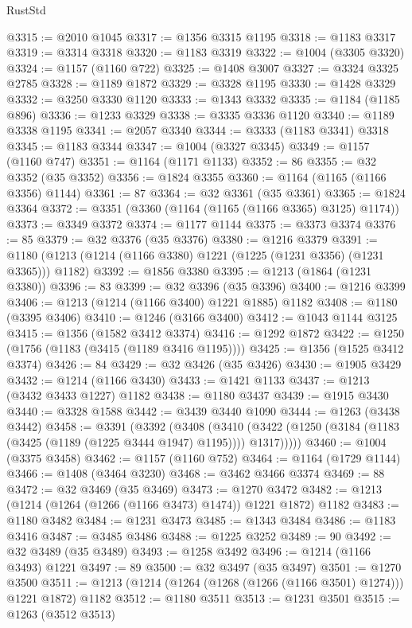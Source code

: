 \begin{lexlean}{RustStd}
\begin{coremodule}
@3315 := @2010 @1045
@3317 := @1356 @3315 @1195
@3318 := @1183 @3317
@3319 := @3314 @3318
@3320 := @1183 @3319
@3322 := @1004 (@3305 @3320)
@3324 := @1157 (@1160 @722)
@3325 := @1408 @3007
@3327 := @3324 @3325 @2785
@3328 := @1189 @1872
@3329 := @3328 @1195
@3330 := @1428 @3329
@3332 := @3250 @3330 @1120
@3333 := @1343 @3332
@3335 := @1184 (@1185 @896)
@3336 := @1233 @3329
@3338 := @3335 @3336 @1120
@3340 := @1189 @3338 @1195
@3341 := @2057 @3340
@3344 := @3333 (@1183 @3341) @3318
@3345 := @1183 @3344
@3347 := @1004 (@3327 @3345)
@3349 := @1157 (@1160 @747)
@3351 := @1164 (@1171 @1133)
@3352 := 86
@3355 := @32 @3352 (@35 @3352)
@3356 := @1824 @3355
@3360 := @1164 (@1165 (@1166 @3356) @1144)
@3361 := 87
@3364 := @32 @3361 (@35 @3361)
@3365 := @1824 @3364
@3372 := @3351 (@3360 (@1164 (@1165 (@1166 @3365) @3125) @1174))
@3373 := @3349 @3372
@3374 := @1177 @1144
@3375 := @3373 @3374
@3376 := 85
@3379 := @32 @3376 (@35 @3376)
@3380 := @1216 @3379
@3391 := @1180 (@1213 (@1214 (@1166 @3380) @1221 (@1225 (@1231 @3356) (@1231 @3365))) @1182)
@3392 := @1856 @3380
@3395 := @1213 (@1864 (@1231 @3380))
@3396 := 83
@3399 := @32 @3396 (@35 @3396)
@3400 := @1216 @3399
@3406 := @1213 (@1214 (@1166 @3400) @1221 @1885) @1182
@3408 := @1180 (@3395 @3406)
@3410 := @1246 (@3166 @3400)
@3412 := @1043 @1144 @3125
@3415 := @1356 (@1582 @3412 @3374)
@3416 := @1292 @1872
@3422 := @1250 (@1756 (@1183 (@3415 (@1189 @3416 @1195))))
@3425 := @1356 (@1525 @3412 @3374)
@3426 := 84
@3429 := @32 @3426 (@35 @3426)
@3430 := @1905 @3429
@3432 := @1214 (@1166 @3430)
@3433 := @1421 @1133
@3437 := @1213 (@3432 @3433 @1227) @1182
@3438 := @1180 @3437
@3439 := @1915 @3430
@3440 := @3328 @1588
@3442 := @3439 @3440 @1090
@3444 := @1263 (@3438 @3442)
@3458 := @3391
    (@3392
      (@3408
        (@3410 (@3422 (@1250 (@3184 (@1183 (@3425 (@1189 (@1225 @3444 @1947) @1195)))) @1317)))))
@3460 := @1004 (@3375 @3458)
@3462 := @1157 (@1160 @752)
@3464 := @1164 (@1729 @1144)
@3466 := @1408 (@3464 @3230)
@3468 := @3462 @3466 @3374
@3469 := 88
@3472 := @32 @3469 (@35 @3469)
@3473 := @1270 @3472
@3482 := @1213 (@1214 (@1264 (@1266 (@1166 @3473) @1474)) @1221 @1872) @1182
@3483 := @1180 @3482
@3484 := @1231 @3473
@3485 := @1343 @3484
@3486 := @1183 @3416
@3487 := @3485 @3486
@3488 := @1225 @3252
@3489 := 90
@3492 := @32 @3489 (@35 @3489)
@3493 := @1258 @3492
@3496 := @1214 (@1166 @3493) @1221
@3497 := 89
@3500 := @32 @3497 (@35 @3497)
@3501 := @1270 @3500
@3511 := @1213 (@1214 (@1264 (@1268 (@1266 (@1166 @3501) @1274))) @1221 @1872) @1182
@3512 := @1180 @3511
@3513 := @1231 @3501
@3515 := @1263 (@3512 @3513)

\end{coremodule}
\end{lexlean}
